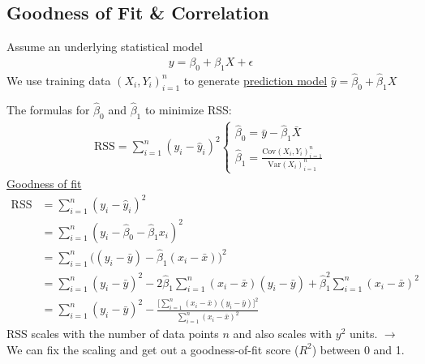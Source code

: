 \documentclass[12pt, letterpaper]{article}
\begin{document}
\subsection{Goodness of Fit \& Correlation}
Assume an underlying statistical model
\begin{align*}
    y = \beta_0 + \beta_1X +\epsilon
\end{align*}
We use training data $(X_i, Y_i)^n_{i=1}$ to generate \underline{prediction model} $\hat y = \hat \beta_0 + \hat \beta_1 X$

\noindent The formulas for $\hat \beta_0$ and $\hat \beta_1$ to minimize RSS:
\begin{align*}
    \text{RSS} = \sum_{i=1}^{n}(y_i-\hat y_i)^2 
    \begin{cases}
        \hat \beta_0 = \bar y - \hat \beta_1 \bar X \\ 
        \hat \beta_1 = \frac{\text{Cov}(X_i,Y_i)^n_{i=1}}{\text{Var}(X_i)^n_{i=1}}
    \end{cases}
\end{align*}
\underline{Goodness of fit}
\begin{align*}
    \text{RSS} &= \sum_{i=1}^{n}(y_i - \hat y_i)^2 \\
    &= \sum_{i=1}^{n}(y_i-\hat \beta_0 - \hat \beta_1x_i)^2 \\
    &= \sum_{i=1}^{n}\Big( (y_i-\bar y )-\hat \beta_1(x_i-\bar x)\Big)^2 \\
    &= \sum_{i=1}^{n}(y_i - \bar y)^2 - 2\hat \beta_1 \sum_{i=1}^{n}(x_i - \bar x)(y_i - \bar y) + \hat \beta_1^2 \sum_{i=1}^{n}(x_i - \bar x)^2 \\
    &= \sum_{i=1}^{n}(y_i - \bar y)^2 - \frac{\Big[ \sum_{i=1}^{n} (x_i - \bar x)(y_i - \bar y)\Big]^2}{\sum_{i=1}^{n} (x_i - \bar x)^2}
\end{align*}
RSS scales with the number of data points $n$ and also scales with $y^2$ units.
$\rightarrow$ We can fix the scaling and get out a goodness-of-fit score ($R^2$) between 0 and 1.
\end{document}
